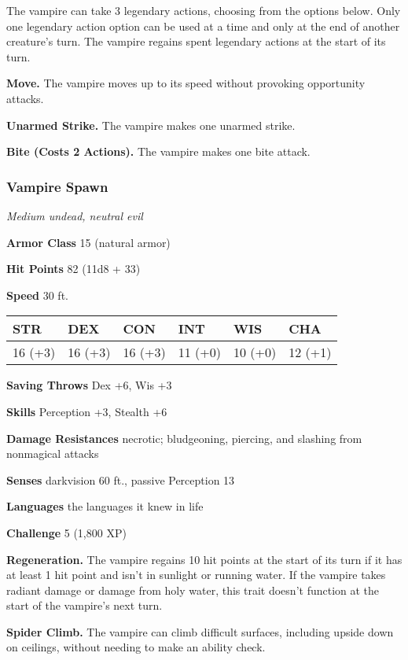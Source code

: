 \documentclass[
]{article}
\begin{document}
The vampire can take 3 legendary actions, choosing from the options
below. Only one legendary action option can be used at a time and only
at the end of another creature's turn. The vampire regains spent
legendary actions at the start of its turn.

\textbf{Move.} The vampire moves up to its speed without provoking
opportunity attacks.

\textbf{Unarmed Strike.} The vampire makes one unarmed strike.

\textbf{Bite (Costs 2 Actions).} The vampire makes one bite attack.

\hypertarget{vampire-spawn}{%
\subsubsection{Vampire Spawn}\label{vampire-spawn}}

\emph{Medium undead, neutral evil}

\textbf{Armor Class} 15 (natural armor)

\textbf{Hit Points} 82 (11d8 + 33)

\textbf{Speed} 30 ft.

\begin{longtable}[]{@{}llllll@{}}
\toprule
STR & DEX & CON & INT & WIS & CHA\tabularnewline
\midrule
\endhead
16 (+3) & 16 (+3) & 16 (+3) & 11 (+0) & 10 (+0) & 12 (+1)\tabularnewline
\bottomrule
\end{longtable}

\textbf{Saving Throws} Dex +6, Wis +3

\textbf{Skills} Perception +3, Stealth +6

\textbf{Damage Resistances} necrotic; bludgeoning, piercing, and
slashing from nonmagical attacks

\textbf{Senses} darkvision 60 ft., passive Perception 13

\textbf{Languages} the languages it knew in life

\textbf{Challenge} 5 (1,800 XP)

\textbf{Regeneration.} The vampire regains 10 hit points at the start of
its turn if it has at least 1 hit point and isn't in sunlight or running
water. If the vampire takes radiant damage or damage from holy water,
this trait doesn't function at the start of the vampire's next turn.

\textbf{Spider Climb.} The vampire can climb difficult surfaces,
including upside down on ceilings, without needing to make an ability
check.
\end{document}
